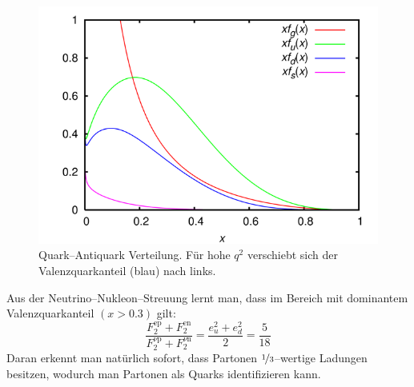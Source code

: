 \documentclass[Ex4_Zusammenfassung.tex]{subfiles}
\begin{document}
\begin{figure}[H]
	\centering
	\includegraphics[scale=0.3]{640px-CTEQ6_parton_distribution_functions.png}
	\caption{Quark--Antiquark Verteilung. Für hohe $q^2$ verschiebt sich der Valenzquarkanteil (blau) nach links.}
\end{figure}
Aus der Neutrino--Nukleon--Streuung lernt man, dass im Bereich mit dominantem Valenzquarkanteil $(x>0.3)$ gilt:
\begin{equation}
	\frac{F_2^{\text{ep}} + F_2^{\text{en}}}{F_2^{\nu\text{p}} + F_2^{\nu\text{n}}} = \frac{e_u^2+e_d^2}{2} = \frac{5}{18}
\end{equation}
Daran erkennt man natürlich sofort, dass Partonen $\nicefrac{1}{3}$--wertige Ladungen besitzen, wodurch man Partonen als Quarks identifizieren kann. 
\end{document}
